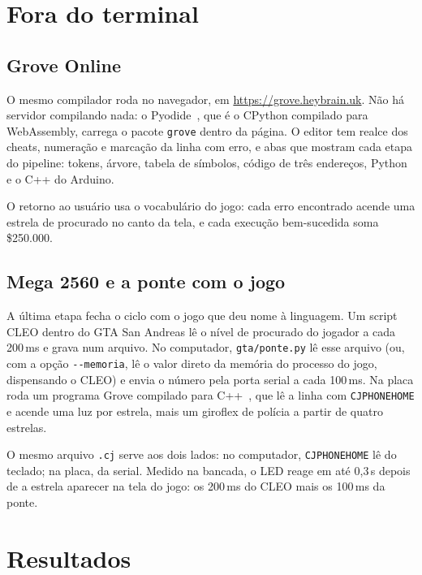 \documentclass[conference]{IEEEtran}
\begin{document}
\section{Fora do terminal}\label{sec:fora}

\subsection{Grove Online}

O mesmo compilador roda no navegador, em \url{https://grove.heybrain.uk}. Não há servidor compilando nada: o Pyodide~\cite{pyodide}, que é o CPython compilado para WebAssembly, carrega o pacote \texttt{grove} dentro da página. O editor tem realce dos cheats, numeração e marcação da linha com erro, e abas que mostram cada etapa do pipeline: tokens, árvore, tabela de símbolos, código de três endereços, Python e o C++ do Arduino.

O retorno ao usuário usa o vocabulário do jogo: cada erro encontrado acende uma estrela de procurado no canto da tela, e cada execução bem-sucedida soma \$250.000.

\subsection{Mega 2560 e a ponte com o jogo}

A última etapa fecha o ciclo com o jogo que deu nome à linguagem. Um script CLEO dentro do GTA San Andreas lê o nível de procurado do jogador a cada 200\,ms e grava num arquivo. No computador, \texttt{gta/ponte.py} lê esse arquivo (ou, com a opção \texttt{-{}-memoria}, lê o valor direto da memória do processo do jogo, dispensando o CLEO) e envia o número pela porta serial a cada 100\,ms. Na placa roda um programa Grove compilado para C++~\cite{arduinocli}, que lê a linha com \texttt{CJPHONEHOME} e acende uma luz por estrela, mais um giroflex de polícia a partir de quatro estrelas.

O mesmo arquivo \texttt{.cj} serve aos dois lados: no computador, \texttt{CJPHONEHOME} lê do teclado; na placa, da serial. Medido na bancada, o LED reage em até 0,3\,s depois de a estrela aparecer na tela do jogo: os 200\,ms do CLEO mais os 100\,ms da ponte.

\section{Resultados}\label{sec:resultados}
\end{document}
